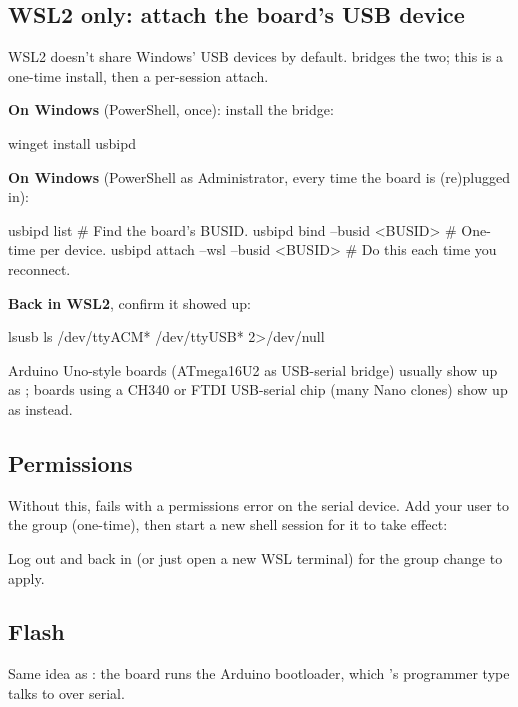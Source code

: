 \subsection{WSL2 only: attach the board's USB device}
\label{c2:d:5}
WSL2 doesn't share Windows' USB devices by default.  bridges the two; this is a
one-time install, then a per-session attach.

\textbf{On Windows} (PowerShell, once): install the bridge:

\begin{shell}
winget install usbipd
\end{shell}

\noindent\textbf{On Windows} (PowerShell as Administrator, every time the board is (re)plugged in):

\begin{shell}
usbipd list                              # Find the board's BUSID.
usbipd bind --busid <BUSID>              # One-time per device.
usbipd attach --wsl --busid <BUSID>      # Do this each time you reconnect.
\end{shell}

\noindent\textbf{Back in WSL2}, confirm it showed up:

\begin{shell}
lsusb
ls /dev/ttyACM* /dev/ttyUSB* 2>/dev/null
\end{shell}

\noindent Arduino Uno-style boards (ATmega16U2 as USB-serial bridge) usually show up as
; boards using a CH340 or FTDI USB-serial chip (many Nano clones) show up as
 instead.

\subsection{Permissions}
\label{c2:d:6}
Without this,  fails with a permissions error on the serial device. Add your user to
the  group (one-time), then start a new shell session for it to take effect:


\noindent Log out and back in (or just open a new WSL terminal) for the group change to apply.

\subsection{Flash}
\label{c2:d:7}
Same idea as : the board runs the Arduino bootloader, which 's
 programmer type talks to over serial.

